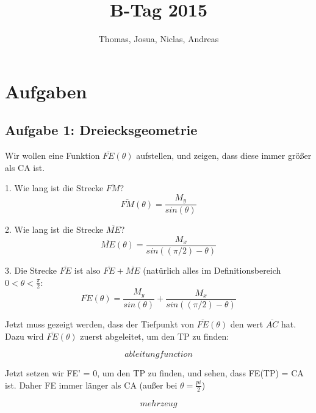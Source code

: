 \documentclass[a4paper,11pt]{article}
\title{B-Tag 2015}
\author{Thomas, Josua, Niclas, Andreas}
\begin{document}
\maketitle
\tableofcontents

\section{Aufgaben}
\subsection{Aufgabe 1: Dreiecksgeometrie}
Wir wollen eine Funktion $\overline{FE}(\theta)$ aufstellen, und zeigen, dass diese immer gr\"o\ss er als CA ist.

1. Wie lang ist die Strecke $\overline{FM}$?
\[ \overline{FM}(\theta) = \frac{M_y}{sin(\theta)} \]

2. Wie lang ist die Strecke $\overline{ME}$?
\[ \overline{ME}(\theta) = \frac{M_x}{sin((\pi/2)-\theta)} \]

3. Die Strecke $\overline{FE}$ ist also $\overline{FE} + \overline{ME}$ (natürlich alles im Definitionsbereich $0 < \theta < \frac{\pi}{2}$:
\[ \overline{FE}(\theta) = \frac{M_y}{sin(\theta)} + \frac{M_x}{sin((\pi/2)-\theta)} \]

Jetzt muss gezeigt werden, dass der Tiefpunkt von $\overline{FE}(\theta)$ den wert $\overline{AC}$ hat. Dazu wird $\overline{FE}(\theta)$ zuerst abgeleitet, um den TP zu finden:

\[ ableitungfunction \]

Jetzt setzen wir FE' = 0, um den TP zu finden, und sehen, dass FE(TP) = CA ist. Daher FE immer länger als CA (au\ss er bei $\theta=\frac{pi}{2}$)

\[ mehr zeug \]
\end{document}
